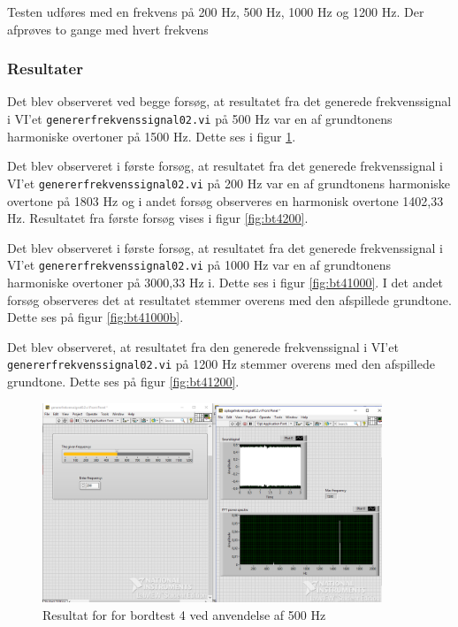			
			Testen udføres med en frekvens på 200 Hz, 500 Hz, 1000 Hz og 1200 Hz. Der afprøves to gange med hvert frekvens  
			
			\subsubsection{Resultater}
			Det blev observeret ved begge forsøg, at resultatet fra det generede frekvenssignal i VI'et \texttt{genererfrekvenssignal02.vi} på 500 Hz var en af grundtonens harmoniske overtoner på 1500 Hz. Dette ses i figur \ref{fig:bt4500}. 

			 Det blev observeret i første forsøg, at resultatet fra det generede frekvenssignal i VI'et \texttt{genererfrekvenssignal02.vi} på 200 Hz var en af grundtonens harmoniske overtone på 1803 Hz og i andet forsøg observeres en harmonisk overtone 1402,33 Hz. Resultatet fra første forsøg vises i figur \ref{fig:bt4200}.
			 
			 Det blev observeret i første forsøg, at resultatet fra det generede frekvenssignal i VI'et \texttt{genererfrekvenssignal02.vi} på 1000 Hz var en af grundtonens harmoniske overtoner på 3000,33 Hz i. Dette ses i figur \ref{fig:bt41000}. I det andet forsøg observeres det at resultatet stemmer overens med den afspillede grundtone. Dette ses på figur \ref{fig:bt41000b}.  
			 
			 Det blev observeret, at resultatet fra den generede frekvenssignal i VI'et \texttt{genererfrekvenssignal02.vi} på 1200 Hz stemmer overens med den afspillede grundtone. Dette ses på figur \ref{fig:bt41200}.  
			 
			\begin{figure}[htb]
			\centering
				\includegraphics[width=4in]{Bordtest4500Hz}
				\caption{Resultat for for bordtest 4 ved anvendelse af 500 Hz}	
				\label{fig:bt4500}
			\end{figure} 
			
